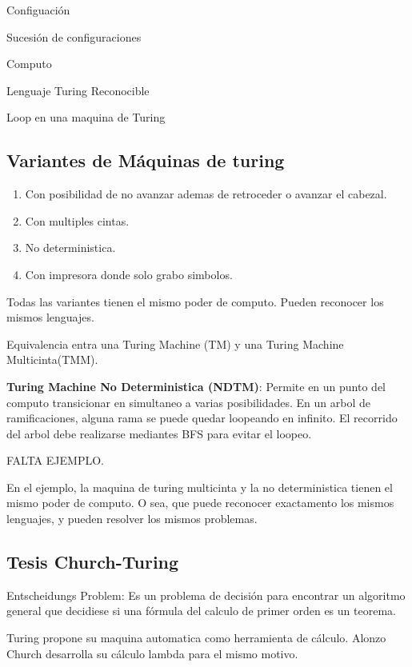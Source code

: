 \documentclass{article}
\begin{document}
Configuación

Sucesión de configuraciones

Computo

Lenguaje Turing Reconocible

Loop en una maquina de Turing



\subsection{Variantes de Máquinas de turing}

\begin{enumerate}
    \item Con posibilidad de no avanzar ademas de retroceder o avanzar el cabezal.
    \item Con multiples cintas.
    \item No deterministica.
    \item Con impresora donde solo grabo simbolos.
\end{enumerate}

Todas las variantes tienen el mismo poder de computo. Pueden reconocer los mismos lenguajes.

Equivalencia entra una Turing Machine (TM) y una Turing Machine Multicinta(TMM).

\textbf{Turing Machine No Deterministica (NDTM)}: Permite en un punto del computo transicionar en simultaneo a varias posibilidades.
En un arbol de ramificaciones, alguna rama se puede quedar loopeando en infinito. 
El recorrido del arbol debe realizarse mediantes BFS para evitar el loopeo.

FALTA EJEMPLO.

En el ejemplo, la maquina de turing multicinta y la no deterministica tienen el mismo poder de computo.
O sea, que puede reconocer exactamento los mismos lenguajes, y pueden resolver los mismos problemas.


\newpage
\subsection{Tesis Church-Turing}

Entscheidungs Problem: Es un problema de decisión para encontrar un algoritmo general que decidiese si una fórmula del calculo 
de primer orden es un teorema.

Turing propone su maquina automatica como herramienta de cálculo. Alonzo Church desarrolla su cálculo lambda para el mismo motivo.
\end{document}
